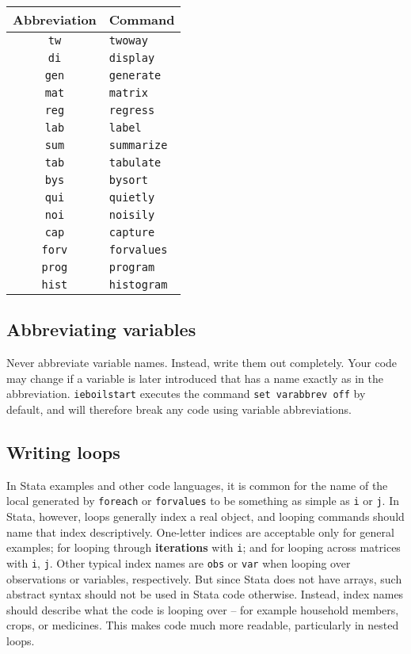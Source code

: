 \begin{center}
	\begin{tabular}{ c | l }
    Abbreviation & Command \\
		\hline
		\texttt{tw} & \texttt{twoway} \\
		\texttt{di} & \texttt{display} \\
		\texttt{gen} & \texttt{generate} \\
		\texttt{mat} & \texttt{matrix} \\
		\texttt{reg} & \texttt{regress} \\
		\texttt{lab} & \texttt{label} \\
		\texttt{sum} & \texttt{summarize} \\
		\texttt{tab} & \texttt{tabulate} \\
		\texttt{bys} & \texttt{bysort} \\
		\texttt{qui} & \texttt{quietly} \\
		\texttt{noi} & \texttt{noisily} \\
		\texttt{cap} & \texttt{capture} \\
		\texttt{forv} & \texttt{forvalues} \\
		\texttt{prog} & \texttt{program} \\
		\texttt{hist} & \texttt{histogram} \\
		\hline
	\end{tabular}
\end{center}

\subsection{Abbreviating variables}

Never abbreviate variable names. Instead, write them out completely.
Your code may change if a variable is later introduced
that has a name exactly as in the abbreviation.
\texttt{ieboilstart} executes the command \texttt{set varabbrev off} by default,
and will therefore break any code using variable abbreviations.

\subsection{Writing loops}

In Stata examples and other code languages, it is common for the name of the local generated by \texttt{foreach} or \texttt{forvalues}
to be something as simple as \texttt{i} or \texttt{j}. In Stata, however,
loops generally index a real object, and looping commands should name that index descriptively.
One-letter indices are acceptable only for general examples;
for looping through \textbf{iterations} with \texttt{i};
and for looping across matrices with \texttt{i}, \texttt{j}.
Other typical index names are \texttt{obs} or \texttt{var} when looping over observations or variables, respectively.
But since Stata does not have arrays, such abstract syntax should not be used in Stata code otherwise.
Instead, index names should describe what the code is looping over --
for example household members, crops, or medicines.
This makes code much more readable, particularly in nested loops.

